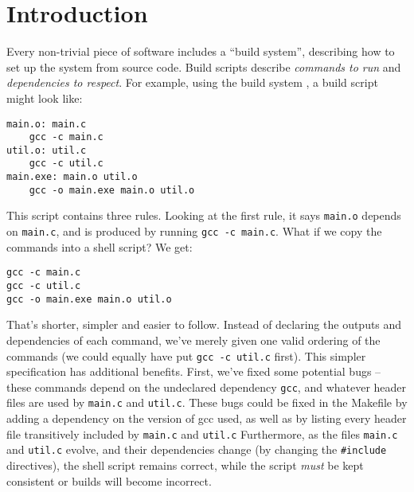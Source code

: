 \section{Introduction}
\label{sec:introduction}


Every non-trivial piece of software includes a ``build system'', describing how to set up the system from source code.
Build scripts \cite{build_systems_a_la_carte} describe \emph{commands to run} and \emph{dependencies to respect}. For example, using the \Make build system \cite{make}, a build script might look like:

\vspace{1mm}
\begin{small}
\begin{verbatim}
main.o: main.c
    gcc -c main.c
util.o: util.c
    gcc -c util.c
main.exe: main.o util.o
    gcc -o main.exe main.o util.o
\end{verbatim}
\end{small}
\vspace{1mm}

This script contains three rules. Looking at the first rule, it says \texttt{main.o} depends on \texttt{main.c}, and is produced by running \texttt{gcc -c main.c}. What if we copy the commands into a shell script? We get:

\vspace{1mm}
\begin{small}
\begin{verbatim}
gcc -c main.c
gcc -c util.c
gcc -o main.exe main.o util.o
\end{verbatim}
\end{small}
\vspace{1mm}

That's shorter, simpler and easier to follow. Instead of declaring the outputs and dependencies of each command, we've merely given one valid ordering of the commands (we could equally have put \texttt{gcc -c util.c} first). This simpler specification has additional benefits. First, we've fixed some potential bugs -- these commands depend on the undeclared dependency \texttt{gcc}, and whatever header files are used by \texttt{main.c} and \texttt{util.c}.  These bugs could be fixed in the Makefile by adding a dependency on the version of gcc used, as well as by listing every header file transitively included by \texttt{main.c} and \texttt{util.c}
Furthermore, as the files \texttt{main.c} and \texttt{util.c} evolve, and their dependencies change (by changing the \texttt{\#include} directives), the shell script remains correct, while the \Make script \emph{must} be kept consistent or builds will become incorrect.

